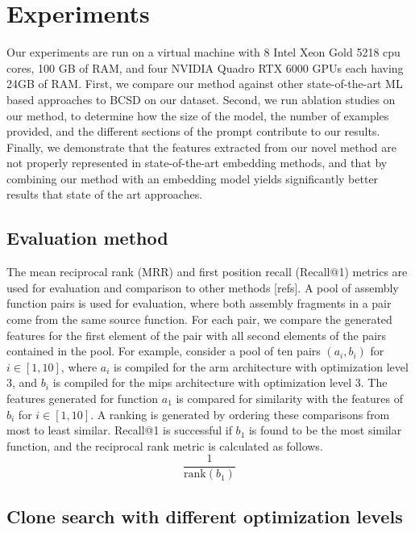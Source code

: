 \documentclass[conference,compsoc]{IEEEtran}
\begin{document}
\section{Experiments}

Our experiments are run on a virtual machine with 8 Intel Xeon Gold 5218 cpu cores, 100 GB of RAM, and four NVIDIA Quadro RTX
6000 GPUs each having  24GB of RAM. First, we compare our method against other state-of-the-art ML based
approaches to BCSD on our dataset. Second, we run ablation studies on our method, to determine how the size
of the model, the number of examples provided, and the different sections of the prompt contribute to our results.
Finally, we demonstrate that the features extracted from our novel method are not properly represented
in state-of-the-art embedding methods, and that by combining our method with an embedding model yields significantly
better results that state of the art approaches.

\subsection{Evaluation method}

The mean reciprocal rank (MRR) and first position recall (Recall@1) metrics are used for evaluation and comparison to other methods
[refs].
A pool of assembly function pairs is used for evaluation, where both assembly fragments in a pair come from the same source function.
For each pair, we compare the generated features for the first element of the pair with all second elements of the pairs contained
in the pool.  For example, consider a pool of ten pairs \((a_i, b_i)\) for \(i \in [1, 10]\), where \(a_i\) is compiled for the arm
architecture with optimization level 3, and \(b_i\) is compiled for the mips architecture with optimization
level 3. The features generated for function \(a_1\) is compared for similarity with the features of \(b_i\) for \(i \in [1, 10]\).
A ranking is generated by ordering these comparisons from most to least similar. Recall@1 is successful
if \(b_1\) is found to be the most similar function, and the reciprocal rank metric is calculated as follows.
\[\frac{1}{\text{rank}(b_1)}\]

\subsection{Clone search with different optimization levels}
\end{document}
